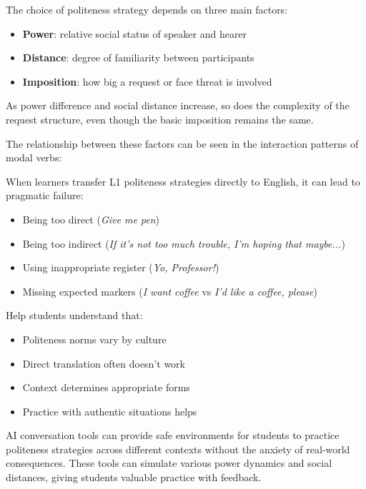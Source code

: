The choice of politeness strategy depends on three main factors:
\begin{itemize}[noitemsep]
    \item \textbf{Power}: relative social status of speaker and hearer
    \item \textbf{Distance}: degree of familiarity between participants
    \item \textbf{Imposition}: how big a request or face threat is involved
\end{itemize}

As power difference and social distance increase, so does the complexity of the request structure, even though the basic imposition remains the same.

The relationship between these factors can be seen in the interaction patterns of modal verbs:
\ea \label{ex:modal-patterns}
    \z
\z

\begin{tcolorbox}[title=Cross-cultural Pragmatic Failure, colback=white]
When learners transfer L1 politeness strategies directly to English, it can lead to pragmatic failure:
\begin{itemize}[noitemsep]
    \item Being too direct (\textit{Give me pen})
    \item Being too indirect (\textit{If it's not too much trouble, I'm hoping that maybe...})
    \item Using inappropriate register (\textit{Yo, Professor!})
    \item Missing expected markers (\textit{I want coffee} vs \textit{I'd like a coffee, please})
\end{itemize}

Help students understand that:
\begin{itemize}[noitemsep]
    \item Politeness norms vary by culture
    \item Direct translation often doesn't work
    \item Context determines appropriate forms
    \item Practice with authentic situations helps
\end{itemize}

AI conversation tools can provide safe environments for students to practice politeness strategies across different contexts without the anxiety of real-world consequences. These tools can simulate various power dynamics and social distances, giving students valuable practice with feedback.
\end{tcolorbox}

